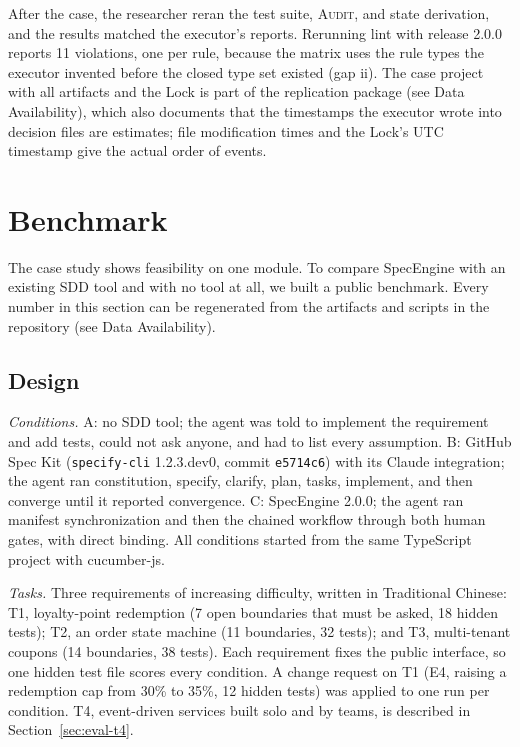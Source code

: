 \documentclass[conference]{IEEEtran}
\newcommand{\code}[1]{\texttt{#1}}
\begin{document}
After the case, the researcher reran the test suite, \textsc{Audit}, and state derivation, and the results matched the executor's reports. Rerunning lint with release 2.0.0 reports 11 violations, one per rule, because the matrix uses the rule types the executor invented before the closed type set existed (gap ii). The case project with all artifacts and the Lock is part of the replication package (see Data Availability), which also documents that the timestamps the executor wrote into decision files are estimates; file modification times and the Lock's UTC timestamp give the actual order of events.

\section{Benchmark}\label{sec:eval}

The case study shows feasibility on one module. To compare SpecEngine with an existing SDD tool and with no tool at all, we built a public benchmark. Every number in this section can be regenerated from the artifacts and scripts in the repository (see Data Availability).

\subsection{Design}

\emph{Conditions.} A: no SDD tool; the agent was told to implement the requirement and add tests, could not ask anyone, and had to list every assumption. B: GitHub Spec Kit (\code{specify-cli} 1.2.3.dev0, commit \code{e5714c6}) with its Claude integration; the agent ran constitution, specify, clarify, plan, tasks, implement, and then converge until it reported convergence. C: SpecEngine 2.0.0; the agent ran manifest synchronization and then the chained workflow through both human gates, with direct binding. All conditions started from the same TypeScript project with cucumber-js.

\emph{Tasks.} Three requirements of increasing difficulty, written in Traditional Chinese: T1, loyalty-point redemption (7 open boundaries that must be asked, 18 hidden tests); T2, an order state machine (11 boundaries, 32 tests); and T3, multi-tenant coupons (14 boundaries, 38 tests). Each requirement fixes the public interface, so one hidden test file scores every condition. A change request on T1 (E4, raising a redemption cap from 30\% to 35\%, 12 hidden tests) was applied to one run per condition. T4, event-driven services built solo and by teams, is described in Section~\ref{sec:eval-t4}.
\end{document}
